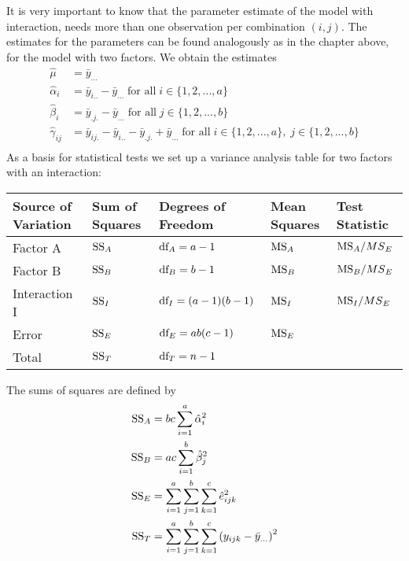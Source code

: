 It is very important to know that the parameter estimate of the model with interaction, needs more than one observation per combination $(i, j)$. The estimates for the parameters can be found analogously as in the chapter above, for the model with two factors. We obtain the estimates
\begin{equation}
  \begin{split}
    \hat{\mu}         &= \bar{y}_{...}\\
    \hat{\alpha}_i    &= \bar{y}_{i..} - \bar{y}_{...} \;\text{for all}\; i \in \{1, 2, ..., a\}\\
    \hat{\beta}_i     &= \bar{y}_{.j.} - \bar{y}_{...}  \;\text{for all}\; j \in \{1, 2, ..., b\}\\
    \hat{\gamma}_{ij} &= \bar{y}_{ij.} - \bar{y}_{i..} - \bar{y}_{.j.} + \bar{y}_{...}  \;\text{for all}\; i \in \{1, 2, ..., a\},\;j \in \{1, 2, ..., b\}\\
  \end{split}
\end{equation}
As a basis for statistical tests we set up a variance analysis table for two factors with an interaction:
\begin{table}[H]
  \footnotesize
  \centering
  \begin{tabular}{ m{1.65cm} | m{0.9cm} l m{0.8cm} m{1.2cm}}
      Source of Variation  & Sum of Squares &  Degrees of Freedom & Mean Squares & Test Statistic \\ \hline
      Factor A      & $\textup{SS}_A$ & $\textup{df}_A = a-1$        & $\textup{MS}_A$ & $\textup{MS}_A / {MS}_E$\\
      Factor B      & $\textup{SS}_B$ & $\textup{df}_B = b-1$        & $\textup{MS}_B$ & $\textup{MS}_B / {MS}_E$\\
      Interaction I & $\textup{SS}_I$ & $\textup{df}_I = (a-1)(b-1)$ & $\textup{MS}_I$ & $\textup{MS}_I / {MS}_E$\\
      Error         & $\textup{SS}_E$ & $\textup{df}_E = ab(c-1)$    & $\textup{MS}_E$ & \\ \hline
      Total         & $\textup{SS}_T$ & $\textup{df}_T = n-1$        &                 &\\
  \end{tabular}
\end{table}
The sums of squares are defined by
\begin{equation}
  \begin{split}
    \textup{SS}_A &= bc \sum_{i=1}^a \hat{\alpha}_i^2\\
    \textup{SS}_B &= ac \sum_{i=1}^b \hat{\beta}_j^2\\
    \textup{SS}_E &= \sum_{i=1}^a \sum_{j=1}^b \sum_{k=1}^c \hat{e}_{ijk}^2\\
    \textup{SS}_T &= \sum_{i=1}^a \sum_{j=1}^b \sum_{k=1}^c \left(y_{ijk} - \bar{y}_{...}\right)^2
  \end{split}
\end{equation}
